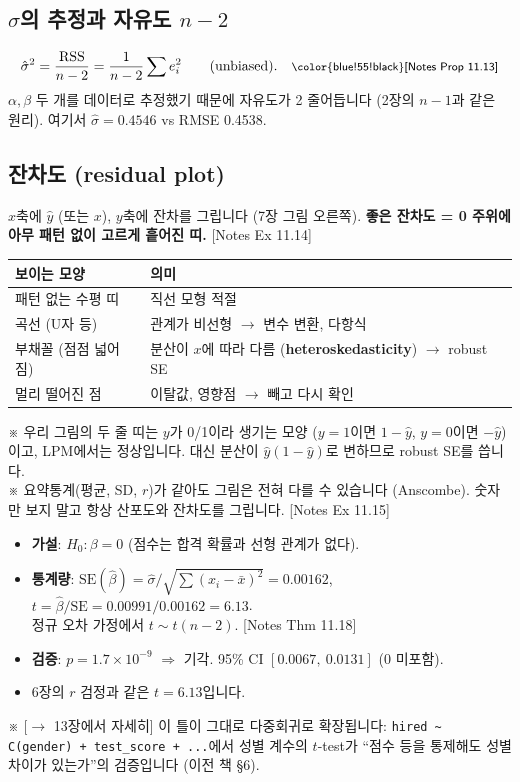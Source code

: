 \documentclass[11pt,a4paper]{article}
\newcommand{\SE}{\mathrm{SE}}
\newcommand{\term}[1]{\textbf{#1}}
\newcommand{\code}[1]{\texttt{#1}}
\newcommand{\nref}[1]{{\footnotesize\textsf{\color{blue!55!black}[Notes #1]}}}
\newcommand{\aside}[1]{{\footnotesize\color{black!65}#1}}
\newcommand{\fwd}[1]{{\footnotesize\textsf{\color{green!40!black}[$\to$ #1에서 자세히]}}}
\begin{document}
\subsection{$\sigma$의 추정과 자유도 $n-2$}
\[
\hat\sigma^2=\frac{\text{RSS}}{n-2}=\frac1{n-2}\sum e_i^2\qquad(\text{unbiased}).\quad \nref{Prop 11.13}
\]
$\alpha,\beta$ 두 개를 데이터로 추정했기 때문에 자유도가 2 줄어듭니다 (2장의 $n-1$과 같은 원리). 여기서 $\hat\sigma=0.4546$ vs RMSE 0.4538.

\subsection{잔차도 (residual plot)}
$x$축에 $\hat y$ (또는 $x$), $y$축에 잔차를 그립니다 (7장 그림 오른쪽). \textbf{좋은 잔차도 = 0 주위에 아무 패턴 없이 고르게 흩어진 띠.} \nref{Ex 11.14}
\begin{center}
\begin{tabular}{@{}p{5cm} p{9cm}@{}}
\toprule
보이는 모양 & 의미 \\
\midrule
패턴 없는 수평 띠 & 직선 모형 적절 \\
곡선 (U자 등) & 관계가 비선형 $\to$ 변수 변환, 다항식 \\
부채꼴 (점점 넓어짐) & 분산이 $x$에 따라 다름 (\term{heteroskedasticity}) $\to$ robust SE \\
멀리 떨어진 점 & 이탈값, 영향점 $\to$ 빼고 다시 확인 \\
\bottomrule
\end{tabular}
\end{center}
\aside{※ 우리 그림의 두 줄 띠는 $y$가 0/1이라 생기는 모양 ($y=1$이면 $1-\hat y$, $y=0$이면 $-\hat y$)이고, LPM에서는 정상입니다. 대신 분산이 $\hat y(1-\hat y)$로 변하므로 robust SE를 씁니다.}\\
\aside{※ 요약통계(평균, SD, $r$)가 같아도 그림은 전혀 다를 수 있습니다 (Anscombe). 숫자만 보지 말고 항상 산포도와 잔차도를 그립니다. \nref{Ex 11.15}}

\begin{hypbox}
\begin{itemize}
\item \textbf{가설}: $H_0:\beta=0$ (점수는 합격 확률과 선형 관계가 없다).
\item \textbf{통계량}: $\SE(\hat\beta)=\hat\sigma/\sqrt{\sum(x_i-\bar x)^2}=0.00162$, \quad $t=\hat\beta/\SE=0.00991/0.00162=6.13$.\\
정규 오차 가정에서 $t\sim t(n-2)$. \nref{Thm 11.18}
\item \textbf{검증}: $p=1.7\times10^{-9}$ $\Rightarrow$ 기각. 95\% CI $[0.0067,\ 0.0131]$ (0 미포함).
\item 6장의 $r$ 검정과 같은 $t=6.13$입니다.
\end{itemize}
\aside{※ \fwd{13장} 이 틀이 그대로 다중회귀로 확장됩니다: \code{hired \~{} C(gender) + test\_score + ...}에서 성별 계수의 $t$-test가 ``점수 등을 통제해도 성별 차이가 있는가''의 검증입니다 (이전 책 §6).}
\end{hypbox}
\end{document}
